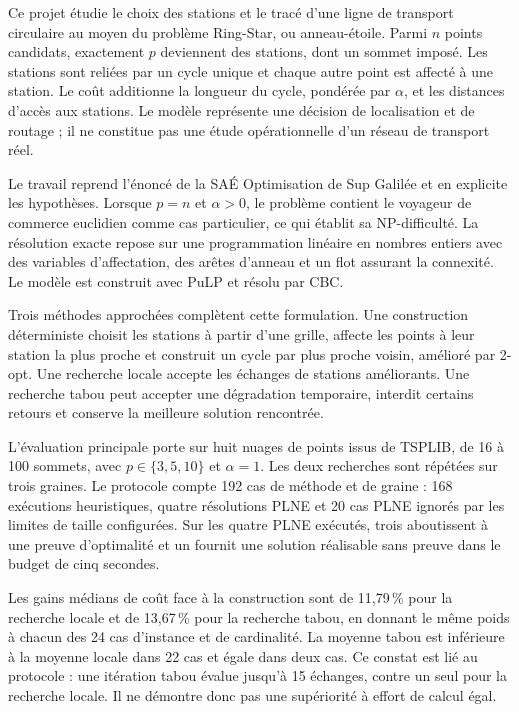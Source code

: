Ce projet étudie le choix des stations et le tracé d'une ligne de transport circulaire
au moyen du problème Ring-Star, ou anneau-étoile. Parmi $n$ points candidats,
exactement $p$ deviennent des stations, dont un sommet imposé. Les stations sont
reliées par un cycle unique et chaque autre point est affecté à une station.
Le coût additionne la longueur du cycle, pondérée par $\alpha$, et les distances
d'accès aux stations. Le modèle représente une décision de localisation et de
routage ; il ne constitue pas une étude opérationnelle d'un réseau de transport réel.

Le travail reprend l'énoncé de la SAÉ Optimisation de Sup Galilée et en explicite
les hypothèses. Lorsque $p=n$ et $\alpha>0$, le problème contient le voyageur de
commerce euclidien comme cas particulier, ce qui établit sa NP-difficulté.
La résolution exacte repose sur une programmation linéaire en nombres entiers
avec des variables d'affectation, des arêtes d'anneau et un flot assurant la
connexité. Le modèle est construit avec PuLP et résolu par CBC.

Trois méthodes approchées complètent cette formulation. Une construction
déterministe choisit les stations à partir d'une grille, affecte les points à leur
station la plus proche et construit un cycle par plus proche voisin, amélioré
par 2-opt. Une recherche locale accepte les échanges de stations améliorants.
Une recherche tabou peut accepter une dégradation temporaire, interdit certains
retours et conserve la meilleure solution rencontrée.

L'évaluation principale porte sur huit nuages de points issus de TSPLIB, de 16 à
100 sommets, avec $p\in\{3,5,10\}$ et $\alpha=1$. Les deux recherches sont répétées
sur trois graines. Le protocole compte 192 cas de méthode et de graine :
168 exécutions heuristiques, quatre résolutions PLNE et 20 cas PLNE ignorés
par les limites de taille configurées. Sur les quatre PLNE exécutés, trois
aboutissent à une preuve d'optimalité et un fournit une solution réalisable
sans preuve dans le budget de cinq secondes.

Les gains médians de coût face à la construction sont de 11,79\,\% pour la
recherche locale et de 13,67\,\% pour la recherche tabou, en donnant le même poids
à chacun des 24 cas d'instance et de cardinalité. La moyenne tabou est inférieure
à la moyenne locale dans 22 cas et égale dans deux cas. Ce constat est lié au
protocole : une itération tabou évalue jusqu'à 15 échanges, contre un seul pour
la recherche locale. Il ne démontre donc pas une supériorité à effort de calcul égal.

